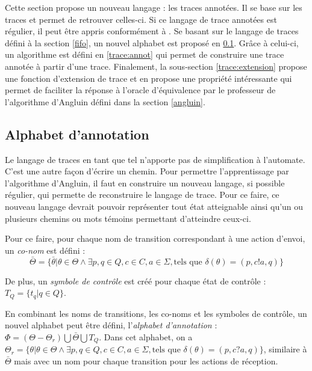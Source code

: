Cette section propose un nouveau langage : les traces annotées. Il se base sur les traces et permet de retrouver celles-ci. Si ce langage de trace annotées est régulier, il peut être appris conformément à \cite{Vardhan04}. Se basant sur le langage de traces défini à la section \ref{fifo}, un nouvel alphabet est proposé en \ref{trace:alpha}. Grâce à celui-ci, un algorithme est défini en \ref{trace:annot} qui permet de construire une trace annotée à partir d'une trace. Finalement, la sous-section \ref{trace:extension} propose une fonction d'extension de trace et en propose une propriété intéressante qui permet de faciliter la réponse à l'oracle d'équivalence par le professeur de l'algorithme d'Angluin défini dans la section \ref{angluin}.





\subsection{Alphabet d'annotation}\label{trace:alpha}

Le langage de traces en tant que tel n'apporte pas de simplification à l'automate. C'est une autre façon d'écrire un chemin. Pour permettre l'apprentissage par l'algorithme d'Angluin, il faut en construire un nouveau langage, si possible régulier, qui permette de reconstruire le langage de trace. Pour ce faire, ce nouveau langage devrait pouvoir représenter tout état atteignable ainsi qu'un ou plusieurs chemins ou mots témoins permettant d'atteindre ceux-ci.

Pour ce faire, pour chaque nom de transition correspondant à une action d'envoi, un \emph{co-nom} est défini :
$$
\bar{\Theta}=\{\bar{\theta}|\theta\in\Theta\wedge\exists p,q \in Q, c\in C, a\in\Sigma,\text{tels que } \delta(\theta)=(p,c!a,q)\}
$$

De plus, un \emph{symbole de contrôle} est créé pour chaque état de contrôle : $T_Q = \{t_q | q\in Q\}$.

En combinant les noms de transitions, les co-noms et les symboles de contrôle, un nouvel alphabet peut être défini, l'\emph{alphabet d'annotation} : $\Phi=(\Theta-\Theta_r)\bigcup\bar{\Theta}\bigcup T_Q$. Dans cet alphabet, on a $\Theta_r=\{\theta|\theta\in\Theta\wedge\exists p,q \in Q, c\in C, a\in\Sigma,\text{tels que } \delta(\theta)=(p,c?a,q)\}$, similaire à $\bar{\Theta}$ mais avec un nom pour chaque transition pour les actions de réception.


